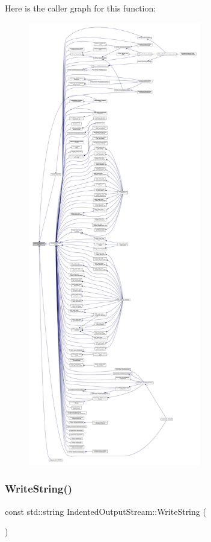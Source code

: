 Here is the caller graph for this function\+:
\nopagebreak
\begin{figure}[H]
\begin{center}
\leavevmode
\includegraphics[height=550pt]{d4/d62/classIndentedOutputStream_a7af26dbbc73375326e27675b25824063_icgraph}
\end{center}
\end{figure}
\mbox{\label{classIndentedOutputStream_a69a252892d688978533206a3cca900bb}} 
\subsubsection{\texorpdfstring{Write\+String()}{WriteString()}}
{\footnotesize\ttfamily const std\+::string Indented\+Output\+Stream\+::\+Write\+String (\begin{DoxyParamCaption}{ }\end{DoxyParamCaption})}



